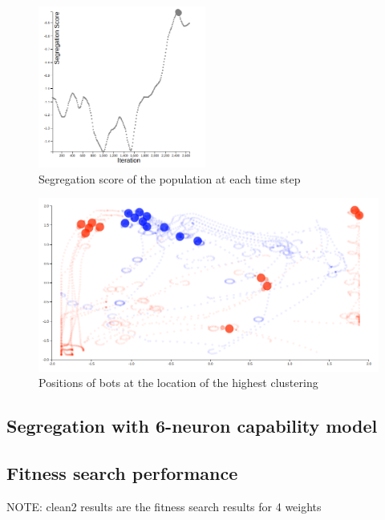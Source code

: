 \begin{figure}
    \centering
    \includegraphics[width=5.5cm]{imgs/final_seg_1.png}
    \caption{Segregation score of the population at each time step}
    \label{fig:final_seg_1}
\end{figure}

\begin{figure}
    \centering
    \includegraphics[width=\linewidth]{imgs/final_place_1.png}
    \caption{Positions of bots at the location of the highest clustering}
    \label{fig:final_pos_1}
\end{figure}

\subsection{Segregation with 6-neuron capability model}
\label{sec:seg6}


\subsection{Fitness search performance}
\label{sec:fitness}

NOTE: clean2 results are the fitness search results for 4 weights
